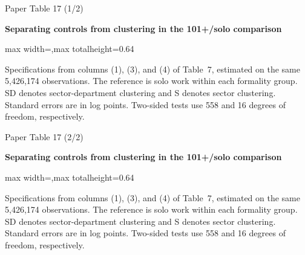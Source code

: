 \begin{frame}{Paper Table 17 (1/2)}
\begin{minipage}{\textwidth}\small\textbf{Separating controls from clustering in the 101+/solo comparison}\end{minipage}\par\vspace{0.15cm}
\centering\begingroup\fontsize{8.5}{10}\selectfont
\setlength{\tabcolsep}{4pt}\renewcommand{\arraystretch}{1.06}
\begin{adjustbox}{max width=\textwidth,max totalheight=0.64\textheight}

\end{adjustbox}\endgroup\par\vspace{0.10cm}
{\fontsize{6.5}{7.5}\selectfont\raggedright Specifications from columns (1), (3), and (4) of Table~7, estimated on the same 5,426,174 observations. The reference is solo work within each formality group. SD denotes sector-department clustering and S denotes sector clustering. Standard errors are in log points. Two-sided tests use 558 and 16 degrees of freedom, respectively.\par}
\end{frame}

\begin{frame}{Paper Table 17 (2/2)}
\begin{minipage}{\textwidth}\small\textbf{Separating controls from clustering in the 101+/solo comparison}\end{minipage}\par\vspace{0.15cm}
\centering\begingroup\fontsize{8.5}{10}\selectfont
\setlength{\tabcolsep}{4pt}\renewcommand{\arraystretch}{1.06}
\begin{adjustbox}{max width=\textwidth,max totalheight=0.64\textheight}

\end{adjustbox}\endgroup\par\vspace{0.10cm}
{\fontsize{6.5}{7.5}\selectfont\raggedright Specifications from columns (1), (3), and (4) of Table~7, estimated on the same 5,426,174 observations. The reference is solo work within each formality group. SD denotes sector-department clustering and S denotes sector clustering. Standard errors are in log points. Two-sided tests use 558 and 16 degrees of freedom, respectively.\par}
\end{frame}

